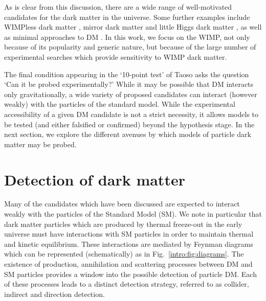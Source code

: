 As is clear from this discussion, there are a wide range of well-motivated candidates for the dark matter in the universe. Some further examples include WIMPless dark matter \cite{Feng:2010}, mirror dark matter \cite{Foot:2014} and little Higgs dark matter \cite{Birkedal:2006}, as well as minimal approaches to DM \cite{Cirelli:2007}. In this work, we focus on the WIMP, not only because of its popularity and generic nature, but because of the large number of experimental searches which provide sensitivity to WIMP dark matter.


The final condition appearing in the `10-point test' of Taoso \etal asks the question `Can it be probed experimentally?' While it may be possible that DM interacts only gravitationally, a wide variety of proposed candidates can interact (however weakly) with the particles of the standard model. While the experimental accessibility of a given DM candidate is not a strict necessity, it allows models to be tested (and either falsified or confirmed) beyond the hypothesis stage. In the next section, we explore the different avenues by which models of particle dark matter may be probed.

\section{Detection of dark matter}

Many of the candidates which have been discussed are expected to interact weakly with the particles of the Standard Model (SM). We note in particular that dark matter particles which are produced by thermal freeze-out in the early universe must have interactions with SM particles in order to maintain thermal and kinetic equilibrium. These interactions are mediated by Feynman diagrams which can be represented (schematically) as in Fig.~\ref{intro:fig:diagrams}. The existence of production, annihilation and scattering processes between DM and SM particles provides a window into the possible detection of particle DM. Each of these processes leads to a distinct detection strategy, referred to as collider, indirect and direction detection.

